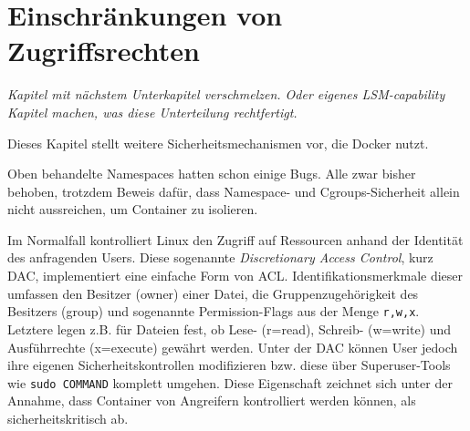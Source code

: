 \documentclass[../main.tex]{subfiles}
\begin{document}







  \section{Einschränkungen von Zugriffsrechten}
		\emph{Kapitel mit nächstem Unterkapitel verschmelzen. Oder eigenes LSM-capability Kapitel machen, was diese Unterteilung rechtfertigt.}

		Dieses Kapitel stellt weitere Sicherheitsmechanismen vor, die Docker nutzt.

		Oben behandelte Namespaces hatten schon einige Bugs. Alle zwar bisher behoben, trotzdem Beweis dafür, dass Namespace- und Cgroups-Sicherheit allein nicht aussreichen, um Container zu isolieren.

		Im Normalfall kontrolliert Linux den Zugriff auf Ressourcen anhand der Identität des anfragenden Users. Diese sogenannte \emph{Discretionary Access Control}, kurz \acrshort{DAC}, implementiert eine einfache Form von \acrshort{ACL}. Identifikationsmerkmale dieser umfassen den Besitzer (owner) einer Datei, die Gruppenzugehörigkeit des Besitzers (group) und sogenannte Permission-Flags aus der Menge \texttt{r,w,x}. Letztere legen z.B. für Dateien fest, ob Lese- (r=read), Schreib- (w=write) und Ausführrechte (x=execute) gewährt werden. Unter der \acrshort{DAC} können User jedoch ihre eigenen Sicherheitskontrollen modifizieren bzw. diese über Superuser-Tools wie \texttt{sudo COMMAND} komplett umgehen. Diese Eigenschaft zeichnet sich unter der Annahme, dass Container von Angreifern kontrolliert werden können, als sicherheitskritisch ab.
\end{document}
